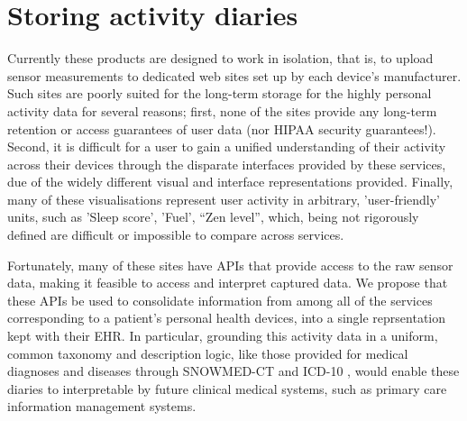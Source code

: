 \documentclass{chi-ext}
\begin{document}
\section{Storing activity diaries}

Currently these products are designed to work in isolation, that is, to upload sensor measurements to dedicated web sites set up by each device's manufacturer.  Such sites are poorly suited for the long-term storage for the highly personal activity data for several reasons; first, none of the sites provide any long-term retention or access guarantees of user data (nor HIPAA security guarantees!).  Second, it is difficult for a user to gain a unified understanding of their activity across their devices through the disparate interfaces provided by these services, due of the widely different visual and interface representations provided. Finally, many of these visualisations represent user activity in arbitrary, 'user-friendly' units, such as 'Sleep score', 'Fuel', ``Zen level'', which, being not rigorously defined are difficult or impossible to compare across services.

Fortunately, many of these sites have APIs that provide access to the raw sensor data, making it feasible to access and interpret captured data.  We propose that these APIs be used to consolidate information from among all of the services corresponding to a patient's personal health devices, into a single reprsentation kept with their EHR.  In particular, grounding this activity data in a uniform, common taxonomy and description logic, like those provided for medical diagnoses and diseases through SNOWMED-CT \cite{stearns2001snomed} and ICD-10 \cite{world1993icd}, would enable these diaries to interpretable by future clinical medical systems, such as primary care information management systems. 


\end{document}
